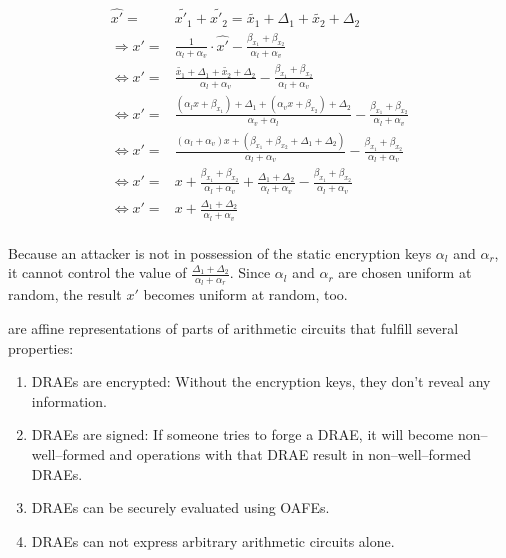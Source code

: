 \begin{align*}
  \widehat{x'} = & \widetilde{x'_1} + \widetilde{x'_2} = \widetilde{x_1} +
  \Delta_1 + \widetilde{x_2} + \Delta_2 \\
  \Rightarrow x' = & \frac{1}{\alpha_l + \alpha_v} \cdot \widehat{x'} -
  \frac{\beta_{x_1} +
  \beta_{x_2}}{\alpha_l + \alpha_v} \\
  \Leftrightarrow x' = & \frac{\widetilde{x_1} + \Delta_1 +
  \widetilde{x_2} + \Delta_2}{\alpha_l + \alpha_v} -
  \frac{\beta_{x_1} +\beta_{x_2}}{\alpha_l + \alpha_v}\\
  \Leftrightarrow x' = & \frac{(\alpha_l x + \beta_{x_1}) + \Delta_1 +
  (\alpha_v x + \beta_{x_2}) + \Delta_2}{\alpha_v + \alpha_l} -
  \frac{\beta_{x_1} +\beta_{x_2}}{\alpha_l + \alpha_v} \\
  \Leftrightarrow x' = & \frac{(\alpha_l+\alpha_v)x + (\beta_{x_1}+\beta_{x_2} +
  \Delta_1+\Delta_2)}{\alpha_l+\alpha_v} -
  \frac{\beta_{x_1} +\beta_{x_2}}{\alpha_l + \alpha_v} \\
  \Leftrightarrow x' = & x + \frac{\beta_{x_1}+\beta_{x_2}}{\alpha_l+\alpha_v}
  + \frac{\Delta_1 + \Delta_2}{\alpha_l + \alpha_v} -
  \frac{\beta_{x_1}+\beta_{x_2}}{\alpha_l + \alpha_v} \\
  \Leftrightarrow x' = & x + \frac{\Delta_1 + \Delta_2}{\alpha_l + \alpha_v}\\
\end{align*}

Because an attacker is not in possession of the static encryption keys
$\alpha_l$ and $\alpha_r$, it cannot control the value of $\frac{\Delta_1 +
\Delta_2}{\alpha_l + \alpha_r}$. Since $\alpha_l$ and $\alpha_r$ are chosen
uniform at random, the result $x'$ becomes uniform at random, too.


%
%
\label{sec:drae}

 are affine representations of
parts of arithmetic circuits that fulfill several properties:

\begin{enumerate}

  \item \label{prop:drae-encrypted} DRAEs are encrypted: Without the encryption
    keys, they don't reveal any information.

  \item \label{prop:drae-signed} DRAEs are signed: If someone tries to forge a
    DRAE, it will become non--well--formed and operations with that DRAE result
    in non--well--formed DRAEs.

  \item \label{prop:drae-oafe} DRAEs can be securely evaluated using OAFEs.

  \item \label{prop:drae-not-enough} DRAEs can not express arbitrary arithmetic
    circuits alone.

\end{enumerate}

